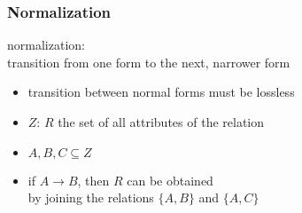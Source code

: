 \documentclass[dvipsnames]{beamer}
\begin{document}
\begin{frame}
  \frametitle{Normalization}

  \begin{definition}
    \alert{normalization}:\\
      transition from one form to the next, narrower form

    \begin{itemize}
      \item transition between normal forms must be lossless
    \end{itemize}
  \end{definition}

  \pause
  \begin{theorem}[Heath]
    \begin{itemize}
      \item $Z$: $R$ the set of all attributes of the relation
      \item $A,B,C \subseteq Z$

      \pause
      \item if $A \rightarrow B$, then $R$ can be obtained\\
	by joining the relations $\{A,B\}$ and $\{A,C\}$
    \end{itemize}
  \end{theorem}
\end{frame}
\end{document}

